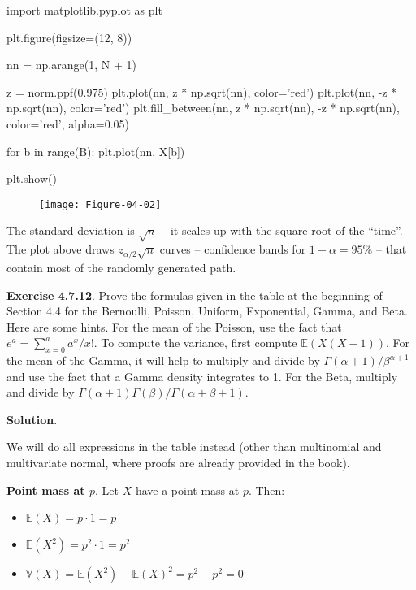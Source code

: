 \begin{python}
import matplotlib.pyplot as plt

plt.figure(figsize=(12, 8))

nn = np.arange(1, N + 1)

z = norm.ppf(0.975)
plt.plot(nn, z * np.sqrt(nn), color='red')
plt.plot(nn, -z * np.sqrt(nn), color='red')
plt.fill_between(nn, z * np.sqrt(nn), -z * np.sqrt(nn), color='red', alpha=0.05)

for b in range(B):
    plt.plot(nn, X[b])
    
plt.show()
\end{python}

\begin{figure}[H]
\texttt{[image: Figure-04-02]}
\end{figure}

The standard deviation is \(\sqrt{n}\) -- it scales up with the square
root of the ``time''. The plot above draws \(z_{\alpha / 2} \sqrt{n}\)
curves -- confidence bands for \(1 - \alpha = 95\%\) -- that contain
most of the randomly generated path.

\textbf{Exercise 4.7.12}. Prove the formulas given in the table at the
beginning of Section 4.4 for the Bernoulli, Poisson, Uniform,
Exponential, Gamma, and Beta. Here are some hints. For the mean of the
Poisson, use the fact that \(e^a = \sum_{x=0}^a a^x / x!\). To compute
the variance, first compute \(\mathbb{E}(X(X - 1))\). For the mean of
the Gamma, it will help to multiply and divide by
\(\Gamma(\alpha + 1) / \beta^{\alpha + 1}\) and use the fact that a
Gamma density integrates to 1. For the Beta, multiply and divide by
\(\Gamma(\alpha + 1) \Gamma(\beta) / \Gamma(\alpha + \beta + 1)\).

\textbf{Solution}.

We will do all expressions in the table instead (other than multinomial
and multivariate normal, where proofs are already provided in the book).

\textbf{Point mass at \(p\)}. Let \(X\) have a point mass at \(p\).
Then:

\begin{itemize}[tightlist]
\item
  \(\mathbb{E}(X) = p \cdot 1 = p\)
\item
  \(\mathbb{E}(X^2) = p^2 \cdot 1 = p^2\)
\item
  \(\mathbb{V}(X) = \mathbb{E}(X^2) - \mathbb{E}(X)^2 = p^2 - p^2 = 0\)
\end{itemize}

